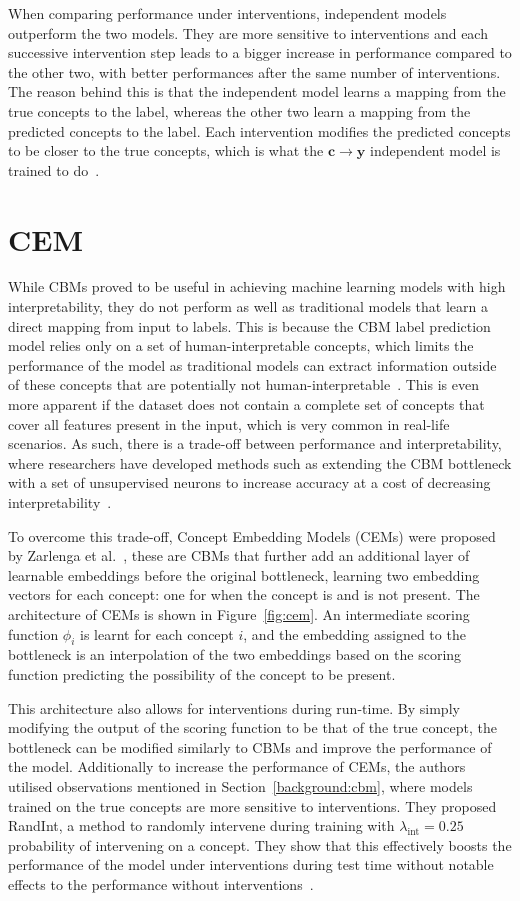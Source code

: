 \documentclass[../main.tex]{subfiles}
\begin{document}
When comparing performance under interventions,
independent models outperform the two models.
They are more sensitive to interventions and each successive intervention step
leads to a bigger increase in performance compared to the other two,
with better performances after the same number of interventions.
The reason behind this
is that the independent model learns a mapping from the true concepts to the label,
whereas the other two learn a mapping from the predicted concepts to the label. Each intervention
modifies the predicted concepts to be closer to the true concepts, which is what the 
$\mathbf{c} \to \mathbf{y}$ independent model is trained to do~\cite{cbm}.

\section{CEM}\label{background:cem}

While CBMs proved to be useful in achieving machine learning models with high
interpretability, they do not perform as well as traditional models that learn a direct
mapping from input to labels. This is because the CBM label
prediction model relies only on a set of human-interpretable concepts, which limits
the performance of the model as traditional models can extract
information outside of these concepts that are potentially not human-interpretable~\cite{cem}. 
This is even more apparent
if the dataset does not contain a complete set of concepts that cover all
features present in the input, which is very common in real-life scenarios.
As such, there is a trade-off between performance and interpretability, where researchers
have developed methods such as extending the CBM bottleneck with a set of unsupervised neurons
to increase accuracy at a cost of decreasing interpretability~\cite{cbm-hybrid}.

To overcome this trade-off, Concept Embedding Models (CEMs) were proposed by Zarlenga et al.~\cite{cem},
these are CBMs that further add an additional layer of learnable embeddings before
the original bottleneck, learning two embedding vectors for each concept: one for
when the concept is and is not present. The architecture of CEMs is shown in Figure~\ref{fig:cem}.
An intermediate scoring function $\phi_i$ is learnt for each concept $i$, 
and the embedding assigned to the bottleneck is an interpolation of the two embeddings
based on the scoring function predicting the possibility of the concept to be present.

This architecture also allows for interventions during run-time. By simply modifying the
output of the scoring function to be that of the true concept, the bottleneck 
can be modified similarly to CBMs and improve the performance of the model. Additionally
to increase the performance of CEMs, the authors utilised observations mentioned in
Section~\ref{background:cbm}, where models trained on the true concepts are more sensitive to 
interventions. They proposed RandInt, a method to randomly intervene
during training with $\lambda_{\text{int}} = 0.25$ probability of intervening
on a concept. They show that this effectively boosts the performance of the model 
under interventions during test time without notable effects to the performance 
without interventions~\cite{cem}.
\end{document}
